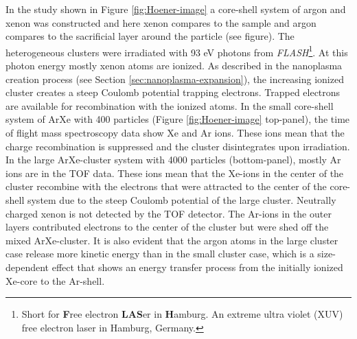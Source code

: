 In the study shown in Figure \ref{fig:Hoener-image} a core-shell system of argon and xenon was constructed and here xenon compares to the sample and argon compares to the sacrificial layer around the particle (see figure). The heterogeneous clusters were irradiated with 93 eV photons from \textit{FLASH}\footnote{Short for \textbf{F}ree electron \textbf{LAS}er in \textbf{H}amburg. An extreme ultra violet (XUV) free electron laser in Hamburg, Germany.}. At this photon energy mostly xenon atoms are ionized. As described in the nanoplasma creation process (see Section \ref{sec:nanoplasma-expansion}), the increasing ionized cluster creates a steep Coulomb potential trapping electrons. Trapped electrons are available for recombination with the ionized atoms. In the small core-shell system of ArXe with 400 particles (Figure \ref{fig:Hoener-image} top-panel), the time of flight mass spectroscopy data show Xe and Ar ions. These ions mean that the charge recombination is suppressed and the cluster disintegrates upon irradiation. In the large ArXe-cluster system with 4000 particles (bottom-panel), mostly Ar ions are in the TOF data. These ions mean that the Xe-ions in the center of the cluster recombine with the electrons that were attracted to the center of the core-shell system due to the steep Coulomb potential of the large cluster. Neutrally charged xenon is not detected by the TOF detector. The Ar-ions in the outer layers contributed electrons to the center of the cluster but were shed off the mixed ArXe-cluster. It is also evident that the argon atoms in the large cluster case release more kinetic energy than in the small cluster case, which is a size-dependent effect that shows an energy transfer process from the initially ionized Xe-core to the Ar-shell.
%
%
%
%